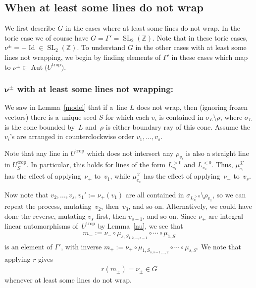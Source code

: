 \documentclass[pdftex]{sigma}
\numberwithin{equation}{section}
\numberwithin{figure}{section}
\numberwithin{table}{section}
\DeclareMathOperator{\Id}{Id}
\DeclareMathOperator{\SL}{SL}
\DeclareMathOperator{\trop}{trop}
\DeclareMathOperator{\Aut}{Aut}
\let\bb=\mathbb
\let\s=\mathcal
\theoremstyle{definition}
\begin{document}
\subsection{When at least some lines do not wrap}\label{Auto-no-wrap}
We first describe $G$ in the cases where at least some lines do not wrap. In the toric case we of course have $G=\Gamma'=\SL_2(\bb{Z})$. Note that in these toric cases, $\nu^{\pm}=-\Id\in \SL_2(\bb{Z})$. To understand $G$ in the other cases with at least some lines not wrapping, we begin by finding elements of $\Gamma'$ in these cases which map to $\nu^{\pm}\in \Aut\big(U^{\trop}\big)$.

\subsubsection[$\nu^{\pm}$ with at least some lines not wrapping:]{$\boldsymbol{\nu^{\pm}}$ with at least some lines not wrapping:} We saw in Lemma~\ref{model} that if a~line $L$ does not wrap, then (ignoring frozen vectors) there is a unique seed $S$ for which each $v_i$ is contained in $\sigma_L\setminus \rho$, where $\sigma_L$ is the cone bounded by~$L$ and~$\rho$ is either boundary ray of this cone. Assume the $v_i$'s are arranged in counterclockwise order $v_1,\dots,v_s$.

Note that any line in $U^{\trop}$ which does not intersect any $\rho_{v_i}$ is also a straight line in $U^{\trop}_S$. In particular, this holds for lines of the form $L_{v_1}^{>0}$ and $L_{v_s}^{<0}$. Thus, $\mu_{e_1}^{\s{X}}$ has the effect of applying~$\nu_+$ to~$v_1$, while $\mu_{e_s}^{\s{X}}$ has the effect of applying~$\nu_-$ to~$v_s$.

Now note that $v_2,\dots,v_s,v_1':=\nu_+(v_1)$ are all contained in $\sigma_{L_{v_1}^{>0}}\setminus \rho_{v_1}$, so we can repeat the process, mutating~$v_2$, then~$v_3$, and so on. Alternatively, we could have done the reverse, mutating $v_s$ first, then $v_{s-1}$, and so on. Since $\nu_{\pm}$ are integral linear automorphisms of~$U^{\trop}$ by Lemma~\ref{nu}, we see that
\begin{gather}\label{m-}
 m_-:=\nu_{-} \circ \mu_{s,S_{1,2,\dots,s-1}}\circ \cdots \circ \mu_{1,S}
\end{gather} is an element of $\Gamma'$, with inverse $m_+:=\nu_+ \circ \mu_{1,S_{s,s-1,\dots,2}}\circ\cdots\circ \mu_{s,S}$. We note that applying $r$ gives
\begin{gather*}
 r(m_{\pm}) = \nu_{\pm}\in G
\end{gather*}
whenever at least some lines do not wrap.
\end{document}
